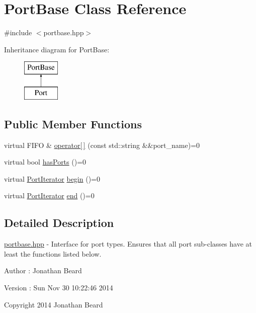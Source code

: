 \hypertarget{class_port_base}{}\section{Port\+Base Class Reference}
\label{class_port_base}


{\ttfamily \#include $<$portbase.\+hpp$>$}

Inheritance diagram for Port\+Base\+:\begin{figure}[H]
\begin{center}
\leavevmode
\includegraphics[height=2.000000cm]{class_port_base}
\end{center}
\end{figure}
\subsection*{Public Member Functions}
\begin{DoxyCompactItemize}
\item 
virtual F\+I\+F\+O \& \hyperlink{class_port_base_ad034502b053f3cd7939d651b2d72cd0a}{operator\mbox{[}$\,$\mbox{]}} (const std\+::string \&\&port\+\_\+name)=0
\item 
virtual bool \hyperlink{class_port_base_a29870b5e201f46a806d2269d7f4635dc}{has\+Ports} ()=0
\item 
virtual \hyperlink{class_port_iterator}{Port\+Iterator} \hyperlink{class_port_base_afc54c92e3b9d1967e8a8c7e74d7507d3}{begin} ()=0
\item 
virtual \hyperlink{class_port_iterator}{Port\+Iterator} \hyperlink{class_port_base_a50427e7a1beea0d5111ccc81ee418178}{end} ()=0
\end{DoxyCompactItemize}


\subsection{Detailed Description}
\hyperlink{portbase_8hpp_source}{portbase.\+hpp} -\/ Interface for port types. Ensures that all port sub-\/classes have at least the functions listed below.

\begin{DoxyAuthor}{Author}
\+: Jonathan Beard 
\end{DoxyAuthor}
\begin{DoxyVersion}{Version}
\+: Sun Nov 30 10\+:22\+:46 2014
\end{DoxyVersion}
Copyright 2014 Jonathan Beard

